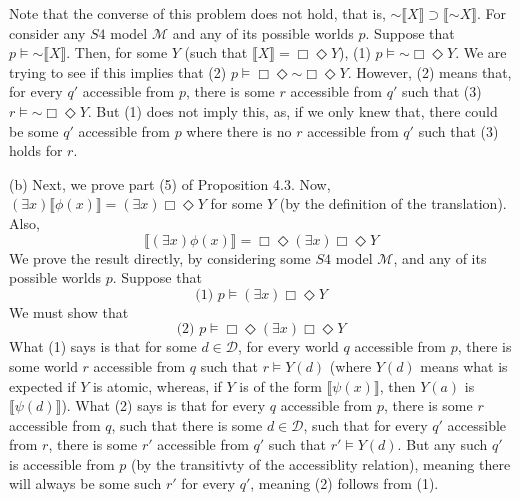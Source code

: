 \documentclass{article}
\newcommand*{\oldneg}{\mathord{\sim}}
\theoremstyle{definition}
\begin{document}
Note that the converse of this problem does not hold, that is, 
$\oldneg\llbracket X\rrbracket\supset\llbracket\oldneg X\rrbracket$. For consider any $S4$ model 
$\mathcal{M}$ and any of its possible worlds $p$. Suppose that 
$p\vDash\oldneg\llbracket X\rrbracket$. Then, for some $Y$ (such that $\llbracket X\rrbracket=\Box\Diamond Y$),
(1) $p\vDash\oldneg\Box\Diamond Y$. We are trying to see if this implies that 
(2) $p\vDash\Box\Diamond\oldneg\Box\Diamond Y$. 
However, (2) means that, for 
every $q'$ accessible from $p$, there is some $r$ accessible from $q'$ such that 
(3) $r\vDash\oldneg\Box\Diamond Y$. But (1) does not imply this, as, if we only knew that, there could be 
some $q'$ accessible from $p$ where there is no $r$ accessible from $q'$ such that (3) holds for $r$. 

(b) Next, we prove part (5) of Proposition 4.3. Now, 
$(\exists x)\llbracket\phi(x)\rrbracket=(\exists x)\Box\Diamond Y$ for some $Y$ (by the definition of the translation). Also, 
\[ \llbracket(\exists x)\phi(x)\rrbracket=\Box\Diamond(\exists x)\Box\Diamond Y\]
We prove the result directly, by considering some $S4$ model $\mathcal{M}$, and any of its possible worlds 
$p$. Suppose that 
\[ \textrm{(1) }p\vDash(\exists x)\Box\Diamond Y \] We must show that
\[ \textrm{(2) }p\vDash\Box\Diamond(\exists x)\Box\Diamond Y \]
What (1) says is that for some $d\in\mathcal{D}$, for every world $q$ accessible from $p$, there is some 
world $r$ accessible from $q$ such that $r\vDash Y(d)$ (where $Y(d)$ means what is expected if $Y$ is atomic, 
whereas, if $Y$ is of the form $\llbracket\psi(x)\rrbracket$, then $Y(a)$ is $\llbracket\psi(d)\rrbracket$).
What (2) says is that for every $q$ accessible from $p$, there is some $r$ accessible from 
$q$, such that there is some $d\in\mathcal{D}$, such that for every 
$q'$ accessible from $r$, there is some $r'$ accessible from $q'$ such that 
$r'\vDash Y(d)$. But any such $q'$ is accessible from $p$ (by the transitivty of the accessiblity relation), meaning
there will always be some such $r'$ for every $q'$, meaning (2) follows from (1).
\end{document}
